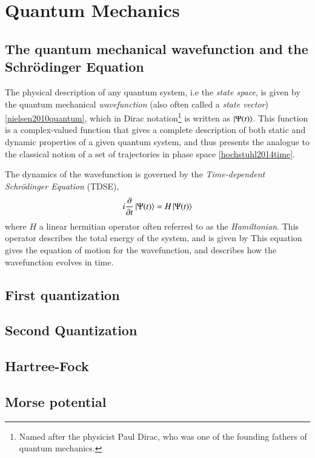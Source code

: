 \documentclass{subfiles}
\begin{document}
\section{Quantum Mechanics}
\subsection*{The quantum mechanical wavefunction and the Schrödinger Equation}
The physical description of any quantum system, i.e the \emph{state space}, is given by the quantum mechanical \emph{wavefunction} (also often called a \emph{state vector})\ref{nielsen2010quantum}, which in Dirac notation\footnote{Named after the physicist Paul Dirac, who was one of the founding fathers of quantum mechanics.} is written as $\ket{\Psi(t)}$. 
This function is a complex-valued function that gives a complete description of both static and dynamic properties of a given quantum system, and thus presents the analogue to the classical notion of a set of trajectories in phase space \ref{hochstuhl2014time}.

The dynamics of the wavefunction is governed by the \emph{Time-dependent Schrödinger Equation} (TDSE),
\begin{equation}
    i\frac{\partial}{\partial t}\ket{\Psi(t)} = H\ket{\Psi(t)}\label{eq:_tdse}
\end{equation}
where $H$ a linear hermitian operator often referred to as the \emph{Hamiltonian}. This operator describes the total energy of the system, and is given by
This equation gives the equation of motion for the wavefunction, and describes how the wavefunction evolves in time.


\subsection*{First quantization}
\subsection*{Second Quantization}
\subsection*{Hartree-Fock}
\subsection*{Morse potential}
\end{document}
